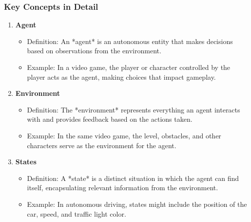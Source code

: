 \documentclass[aspectratio=169]{beamer}
\begin{document}
\begin{frame}[fragile]
    \frametitle{Key Concepts in Detail}
    \begin{enumerate}
        \item \textbf{Agent}
            \begin{itemize}
                \item Definition: An *agent* is an autonomous entity that makes decisions based on observations from the environment.
                \item Example: In a video game, the player or character controlled by the player acts as the agent, making choices that impact gameplay.
            \end{itemize}
        
        \item \textbf{Environment}
            \begin{itemize}
                \item Definition: The *environment* represents everything an agent interacts with and provides feedback based on the actions taken.
                \item Example: In the same video game, the level, obstacles, and other characters serve as the environment for the agent.
            \end{itemize}
        
        \item \textbf{States}
            \begin{itemize}
                \item Definition: A *state* is a distinct situation in which the agent can find itself, encapsulating relevant information from the environment.
                \item Example: In autonomous driving, states might include the position of the car, speed, and traffic light color.
            \end{itemize}
    \end{enumerate}
\end{frame}
\end{document}
